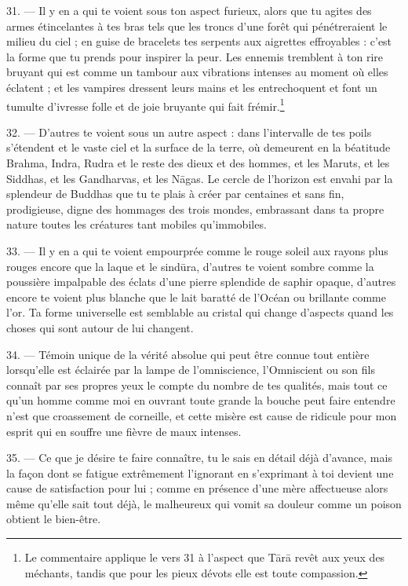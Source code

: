 \documentclass[a4paper, 11pt, oneside, french, landscape, twocolumn]{article}
\begin{document}
31. --- Il y en a qui te voient sous ton aspect furieux, alors que tu agites des armes étincelantes à tes bras tels que les troncs d'une forêt qui pénétreraient le milieu du ciel ; en guise de bracelets tes serpents aux aigrettes effroyables : c'est la forme que tu prends pour inspirer la peur. Les ennemis tremblent à ton rire bruyant qui est comme un tambour aux vibrations intenses au moment où elles éclatent ; et les vampires dressent leurs mains et les entrechoquent et font un tumulte d'ivresse folle et de joie bruyante qui fait frémir.\footnote{Le commentaire applique le vers 31 à l'aspect que T\={a}r\={a} revêt aux yeux des méchants, tandis que pour les pieux dévots elle est toute compassion.}

32. --- D'autres te voient sous un autre aspect : dans l'intervalle de tes poils s'étendent et le vaste ciel et la surface de la terre, où demeurent en la béatitude Brahma, Indra, Rudra et le reste des dieux et des hommes, et les Maruts, et les Siddhas, et les Gandharvas, et les N\={a}gas. Le cercle de l'horizon est envahi par la splendeur de Buddhas que tu te plais à créer par centaines et sans fin, prodigieuse, digne des hommages des trois mondes, embrassant dans ta propre nature toutes les créatures tant mobiles qu'immobiles.

33. --- Il y en a qui te voient empourprée comme le rouge soleil aux rayons plus rouges encore que la laque et le sind\={u}ra, d'autres te voient sombre comme la poussière impalpable des éclats d'une pierre splendide de saphir opaque, d'autres encore te voient plus blanche que le lait baratté de l'Océan ou brillante comme l'or. Ta forme universelle est semblable au cristal qui change d'aspects quand les choses qui sont autour de lui changent.

34. --- Témoin unique de la vérité absolue qui peut être connue tout entière lorsqu'elle est éclairée par la lampe de l'omniscience, l'Omniscient ou son fils connaît par ses propres yeux le compte du nombre de tes qualités, mais tout ce qu'un homme comme moi en ouvrant toute grande la bouche peut faire entendre n'est que croassement de corneille, et cette misère est cause de ridicule pour mon esprit qui en souffre une fièvre de maux intenses.

35. --- Ce que je désire te faire connaître, tu le sais en détail déjà d'avance, mais la façon dont se fatigue extrêmement l'ignorant en s'exprimant à toi devient une cause de satisfaction pour lui ; comme en présence d'une mère affectueuse alors même qu'elle sait tout déjà, le malheureux qui vomit sa douleur comme un poison obtient le bien-être.
\end{document}
